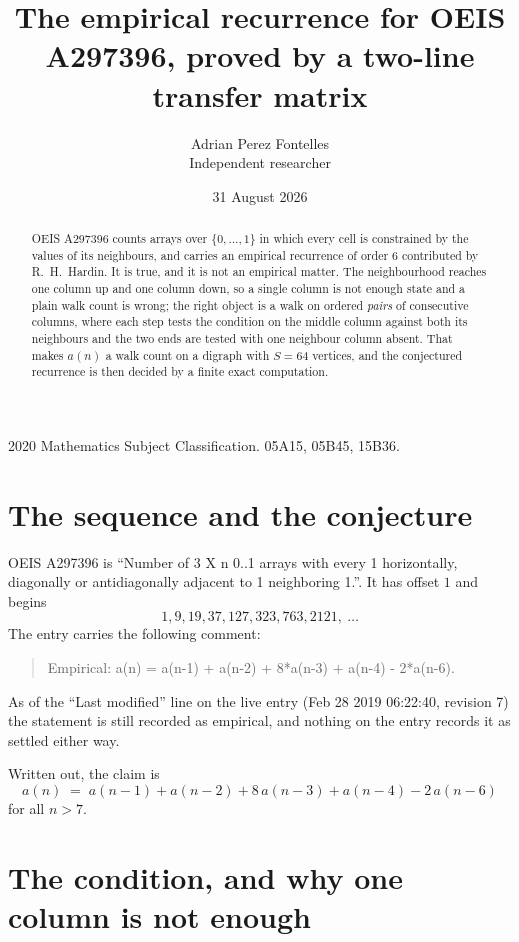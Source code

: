 \documentclass[11pt,a4paper]{article}
\title{The empirical recurrence for OEIS A297396, proved by a two-line transfer matrix}
\author{Adrian Perez Fontelles\\ \small Independent researcher}
\date{31 August 2026}
\theoremstyle{plain}
\theoremstyle{definition}
\begin{document}
\maketitle

\begin{abstract}
OEIS A297396 counts arrays over $\{0,\dots,1\}$ in which every cell is constrained by the
values of its neighbours, and carries an empirical recurrence of order $6$ contributed
by R.~H.~Hardin. It is true, and it is not an empirical matter. The neighbourhood reaches one
column up and one column down, so a single column is not enough state and a plain walk count
is wrong; the right object is a walk on ordered \emph{pairs} of consecutive columns, where
each step tests the condition on the middle column against both its neighbours and the two
ends are tested with one neighbour column absent. That makes $a(n)$ a walk count on a digraph
with $S=64$ vertices, and the conjectured recurrence is then decided by a finite exact
computation.
\end{abstract}

\noindent\small 2020 Mathematics Subject Classification. 05A15, 05B45, 15B36.\normalsize

\section{The sequence and the conjecture}

OEIS A297396 is ``Number of 3 X n 0..1 arrays with every 1 horizontally, diagonally or antidiagonally adjacent to 1 neighboring 1.''. It has offset $1$ and begins
\[
1, 9, 19, 37, 127, 323, 763, 2121,\ \dots
\]
The entry carries the following comment:
\begin{quote}\small
Empirical: a(n) = a(n-1) + a(n-2) + 8*a(n-3) + a(n-4) - 2*a(n-6).
\end{quote}
As of the ``Last modified'' line on the live entry (Feb 28 2019 06:22:40, revision 7) the statement is
still recorded as empirical, and nothing on the entry records it as settled either way.

Written out, the claim is
\begin{equation}\label{eq:conj}
a(n)\;=\;a(n-1) + a(n-2) + 8\,a(n-3) + a(n-4) - 2\,a(n-6)
\end{equation}
for all $n>7$.

\section{The condition, and why one column is not enough}
\end{document}
